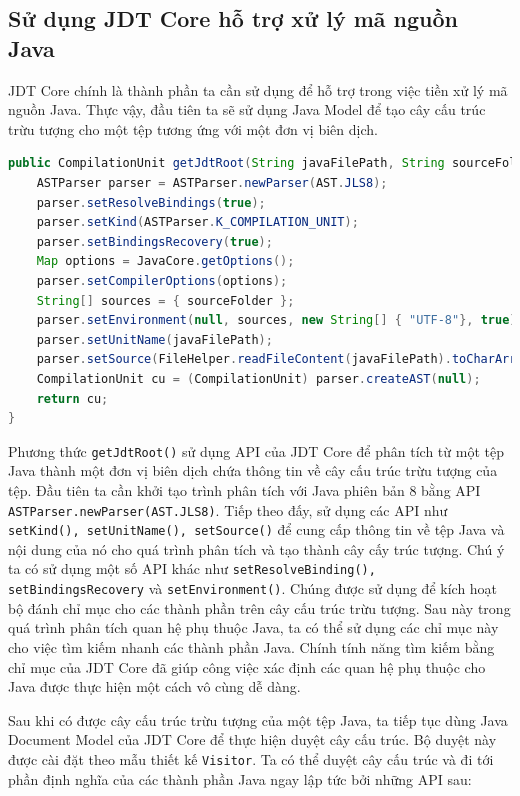 \documentclass[12pt]{report}
\begin{document}
\subsection{Sử dụng JDT Core hỗ trợ xử lý mã nguồn Java}
JDT Core chính là thành phần ta cần sử dụng để hỗ trợ trong việc tiền xử lý mã nguồn Java. Thực vậy, đầu tiên ta sẽ sử dụng Java Model để tạo cây cấu trúc trừu tượng cho một tệp tương ứng với một đơn vị biên dịch.
\begin{lstlisting}[language=Java,
caption={Sử dụng API của JDT Core để tạo cây cấu trúc trừu tượng},label={code:jdt-ast-gen}]
public CompilationUnit getJdtRoot(String javaFilePath, String sourceFolder) throws IOException {
	ASTParser parser = ASTParser.newParser(AST.JLS8);
	parser.setResolveBindings(true);
	parser.setKind(ASTParser.K_COMPILATION_UNIT);
	parser.setBindingsRecovery(true);
	Map options = JavaCore.getOptions();
	parser.setCompilerOptions(options);
	String[] sources = { sourceFolder };
	parser.setEnvironment(null, sources, new String[] { "UTF-8"}, true);
	parser.setUnitName(javaFilePath);
	parser.setSource(FileHelper.readFileContent(javaFilePath).toCharArray());
	CompilationUnit cu = (CompilationUnit) parser.createAST(null);
	return cu;
}
\end{lstlisting}

Phương thức \texttt{getJdtRoot()} sử dụng API của JDT Core để phân tích từ một tệp Java thành một đơn vị biên dịch chứa thông tin về cây cấu trúc trừu tượng của tệp. Đầu tiên ta cần khởi tạo trình phân tích với Java phiên bản 8 bằng API \texttt{ASTParser.newParser(AST.JLS8)}. Tiếp theo đấy, sử dụng các API như \texttt{setKind(), setUnitName(), setSource()} để cung cấp thông tin về tệp Java và nội dung của nó cho quá trình phân tích và tạo thành cây cấy trúc tượng. Chú ý ta có sử dụng một số API khác như \texttt{setResolveBinding(), setBindingsRecovery} và \texttt{setEnvironment()}. Chúng được sử dụng để kích hoạt bộ đánh chỉ mục cho các thành phần trên cây cấu trúc trừu tượng. Sau này trong quá trình phân tích quan hệ phụ thuộc Java, ta có thể sử dụng các chỉ mục này cho việc tìm kiếm nhanh các thành phần Java. Chính tính năng tìm kiếm bằng chỉ mục của JDT Core đã giúp công việc xác định các quan hệ phụ thuộc cho Java được thực hiện một cách vô cùng dễ dàng.

Sau khi có được cây cấu trúc trừu tượng của một tệp Java, ta tiếp tục dùng Java Document Model của JDT Core để thực hiện duyệt cây cấu trúc. Bộ duyệt này được cài đặt theo mẫu thiết kế \texttt{Visitor}. Ta có thể duyệt cây cấu trúc và đi tới phần định nghĩa của các thành phần Java ngay lập tức bởi những API sau:
\end{document}
